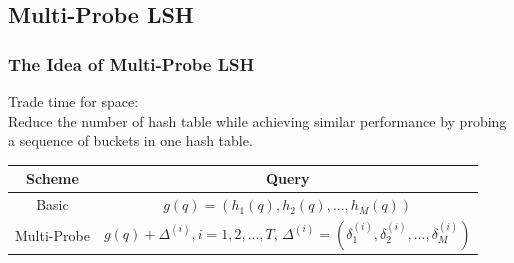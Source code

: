 \subsection{Multi-Probe LSH}
\begin{frame}
\frametitle{The Idea of Multi-Probe LSH~\cite{lv2007multi}}
Trade time for space:\\
Reduce the number of hash table while achieving similar performance by probing a sequence of buckets in one hash table.

\begin{table}
\begin{tabular}{|c|c|}
\hline
  \textbf{Scheme} & \textbf{Query}\\ \hline
  Basic& $g(q)=(h_1(q), h_2(q), ..., h_M(q))$ \\ \hline
  Multi-Probe& $g(q){+}\Delta^{(i)}, i{=}1,2,...,T$, $\Delta^{(i)}{=}(\delta_1^{(i)}, \delta_2^{(i)}, ..., \delta_M^{(i)})$ \\ \hline
\end{tabular}
\end{table}
\end{frame}

